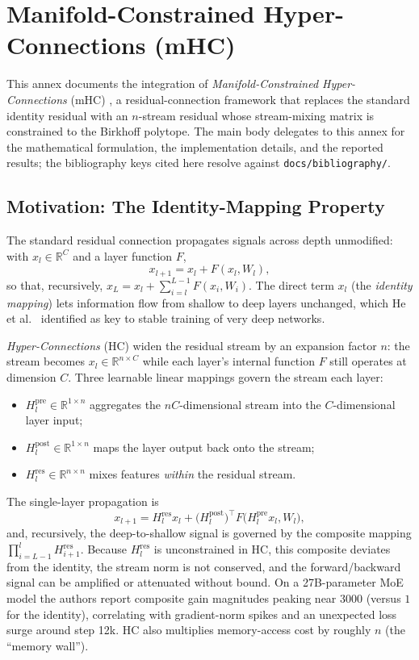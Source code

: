\section{Manifold-Constrained Hyper-Connections (mHC)}
\label{sec:annex-mhc}

This annex documents the integration of \emph{Manifold-Constrained
Hyper-Connections} (mHC) \citep{xie_mhc_2025}, a residual-connection framework
that replaces the standard identity residual with an $n$-stream residual whose
stream-mixing matrix is constrained to the Birkhoff polytope. The main body
delegates to this annex for the mathematical formulation, the implementation
details, and the reported results; the bibliography keys cited here resolve
against \texttt{docs/bibliography/}.

\subsection{Motivation: The Identity-Mapping Property}

The standard residual connection \citep{he_deep_2016} propagates signals across
depth unmodified: with $x_l \in \mathbb{R}^{C}$ and a layer function $F$,
\[
x_{l+1} = x_l + F(x_l, W_l),
\]
so that, recursively, $x_L = x_l + \sum_{i=l}^{L-1} F(x_i, W_i)$. The direct
term $x_l$ (the \emph{identity mapping}) lets information flow from shallow to
deep layers unchanged, which He et al.~\citep{he_deep_2016} identified as key
to stable training of very deep networks.

\emph{Hyper-Connections} (HC) \citep{xie_mhc_2025} widen the residual stream by
an expansion factor $n$: the stream becomes $x_l \in \mathbb{R}^{n \times C}$
while each layer's internal function $F$ still operates at dimension $C$. Three
learnable linear mappings govern the stream each layer:
\begin{itemize}[leftmargin=*]
    \item $H^{\text{pre}}_l \in \mathbb{R}^{1 \times n}$ aggregates the
        $nC$-dimensional stream into the $C$-dimensional layer input;
    \item $H^{\text{post}}_l \in \mathbb{R}^{1 \times n}$ maps the layer output
        back onto the stream;
    \item $H^{\text{res}}_l \in \mathbb{R}^{n \times n}$ mixes features
        \emph{within} the residual stream.
\end{itemize}
The single-layer propagation is
\[
x_{l+1} = H^{\text{res}}_l x_l + \big(H^{\text{post}}_l\big)^{\!\top}
F\big(H^{\text{pre}}_l x_l, W_l\big),
\]
and, recursively, the deep-to-shallow signal is governed by the composite
mapping $\prod_{i=L-1}^{l} H^{\text{res}}_{i+1}$. Because $H^{\text{res}}_l$ is
unconstrained in HC, this composite deviates from the identity, the stream
norm is not conserved, and the forward/backward signal can be amplified or
attenuated without bound. On a 27B-parameter MoE model the authors report
composite gain magnitudes peaking near $3000$ (versus $1$ for the identity),
correlating with gradient-norm spikes and an unexpected loss surge around step
12k. HC also multiplies memory-access cost by roughly $n$ (the ``memory
wall'').

